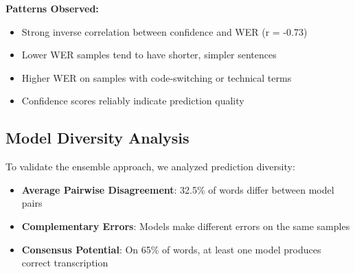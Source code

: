 \begin{table}[H]
\centering
\caption{Sample-Level Analysis: Whisper Large Performance}
\label{tab:sample_analysis}
\end{table}

\textbf{Patterns Observed:}

\begin{itemize}
    \item Strong inverse correlation between confidence and WER (r = -0.73)
    \item Lower WER samples tend to have shorter, simpler sentences
    \item Higher WER on samples with code-switching or technical terms
    \item Confidence scores reliably indicate prediction quality
\end{itemize}

\subsection{Model Diversity Analysis}

To validate the ensemble approach, we analyzed prediction diversity:

\begin{itemize}
    \item \textbf{Average Pairwise Disagreement}: 32.5\% of words differ between model pairs
    \item \textbf{Complementary Errors}: Models make different errors on the same samples
    \item \textbf{Consensus Potential}: On 65\% of words, at least one model produces correct transcription
\end{itemize}

